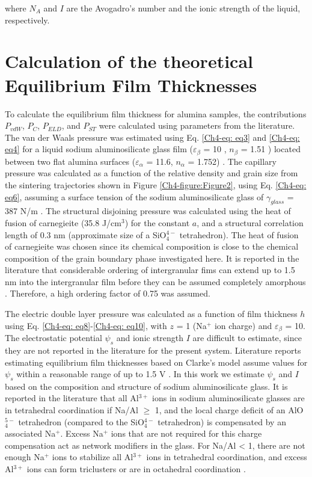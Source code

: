 \noindent where $N_{A}$ and $I$ are the Avogadro's number and the ionic strength of the liquid, respectively.

\section{Calculation of the theoretical Equilibrium Film Thicknesses}
To calculate the equilibrium film thickness for alumina samples, the contributions $P_{vdW}$, $P_{C}$, $P_{ELD}$, and $P_{ST}$ were calculated using parameters from the literature. The van der Waals pressure was estimated using Eq. \ref{Ch4-eq: eq3} and \ref{Ch4-eq: eq4} for a liquid sodium aluminosilicate glass film ($\varepsilon_{\beta}$ = 10 \cite{Hsieh1996}, $n_{\beta}$ = 1.51 \cite{Day1962}) located between two flat alumina surfaces ($\varepsilon_{\alpha}$ = 11.6, $n_{\alpha}$ = 1.752) \cite{Clarke1987}. The capillary pressure was calculated as a function of the relative density and grain size from the sintering trajectories shown in Figure \ref{Ch4-figure:Figure2}, using Eq. \ref{Ch4-eq: eq6}, assuming a surface tension of the sodium aluminosilicate glass of $\gamma_{glass}$ = 387 N/m \cite{Lyon1942}. The structural disjoining pressure was calculated using the heat of fusion of carnegieite (35.8 J/cm$^{3}$) for the constant $a$, and a structural correlation length of 0.3 nm (approximate size of a SiO$_{4}^{4-}$ tetrahedron). The heat of fusion of carnegieite was chosen since its chemical composition is close to the chemical composition of the grain boundary phase investigated here. It is reported in the literature that considerable ordering of intergranular fims can extend up to 1.5 nm into the intergranular film before they can be assumed completely amorphous \cite{Zhang2005}. Therefore, a high ordering factor of 0.75 was assumed.

The electric double layer pressure was calculated as a function of film thickness $h$ using Eq. \ref{Ch4-eq: eq8}-\ref{Ch4-eq: eq10}, with $z$ = 1 (Na$^{+}$ ion charge) and $\varepsilon_{\beta}$ = 10. The electrostatic potential $\psi_{s}$ and ionic strength $I$ are difficult to estimate, since they are not reported in the literature for the present system. Literature reports estimating equilibrium film thicknesses based on Clarke's model assume values for $\psi_{s}$ within a reasonable range of up to 1.5 V \cite{Clarke1993,Tanaka1993}. In this work we estimate $\psi_{s}$ and $I$ based on the composition and structure of sodium aluminosilicate glass. It is reported in the literature \cite{Toplis1997} that all Al$^{3+}$ ions in sodium aluminosilicate glasses are in tetrahedral coordination if Na/Al $\geq$ 1, and the local charge deficit of an AlO$_{4}^{5-}$ tetrahedron (compared to the SiO$_{4}^{4-}$ tetrahedron) is compensated by an associated Na$^{+}$. Excess Na$^{+}$ ions that are not required for this charge compensation act as network modifiers in the glass. For Na/Al < 1, there are not enough Na$^{+}$ ions to stabilize all Al$^{3+}$ ions in tetrahedral coordination, and excess Al$^{3+}$ ions can form triclusters or are in octahedral coordination \cite{Toplis1997}. 

